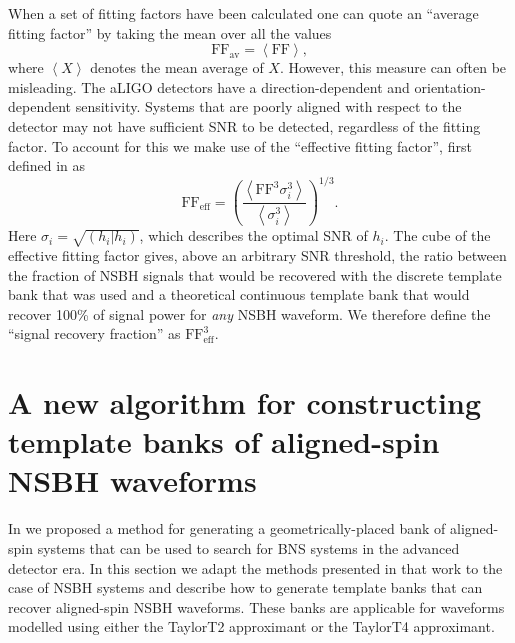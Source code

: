 When a set of fitting factors have been calculated one can quote an ``average 
fitting factor'' by taking the mean over all the values
%
\begin{equation}
 \textrm{FF}_{\textrm{av}} =  \left\langle \textrm{FF}
\right\rangle,
\end{equation}
%
where $\left\langle X \right\rangle$ denotes the mean average of $X$.
However, this measure can often be misleading.
The \ac{aLIGO} detectors have a direction-dependent and
orientation-dependent sensitivity. Systems that are poorly aligned with respect
to the detector may not have sufficient \ac{SNR} to be detected, regardless of
the fitting factor.
To account for this we make use of the ``effective fitting factor'',
first defined in \cite{Buonanno:2002fy} as
%
\begin{equation}
 \textrm{FF}_{\textrm{eff}} = \left( 
 \frac{ \left\langle \textrm{FF}^3 \sigma_i^3 \right\rangle }{\left\langle
\sigma_i^3 \right\rangle} \right)^{1/3}.
\end{equation}
%
Here $\sigma_i = \sqrt{(h_i|h_i)}$, which describes the optimal \ac{SNR}
of $h_i$. The cube of the effective fitting factor gives, above an
arbitrary \ac{SNR} threshold, the ratio between the fraction of \ac{NSBH}
signals that would be recovered with the discrete template bank that was used
and a theoretical continuous template bank that would recover 100\% of signal
power for \emph{any} \ac{NSBH} waveform. We therefore define the ``signal
recovery fraction'' as $\textrm{FF}_{\textrm{eff}}^3$.

\section{A new algorithm for constructing template banks of aligned-spin NSBH 
waveforms}
\label{sec:bank_method}

In \cite{Brown:2012qf} we proposed a method for generating a
geometrically-placed bank of aligned-spin
systems that can be used to search for \ac{BNS} systems in the advanced detector
era. In this section we adapt the methods presented in that work to the case of
\ac{NSBH} systems and describe how to generate template banks that can recover
aligned-spin \ac{NSBH} waveforms. These banks are applicable for waveforms
modelled using either the TaylorT2 approximant or the TaylorT4 approximant.

